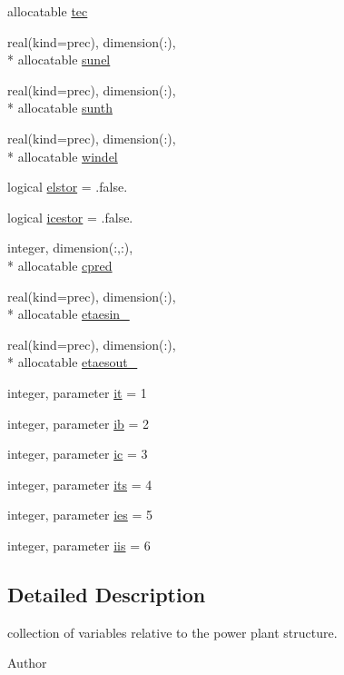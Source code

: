 \begin{DoxyCompactItemize}
allocatable \hyperlink{classplantvar_a4de39d7f2e55534eeac1a570bf8d30ff}{tec}
\item 
real(kind=prec), dimension(\-:), \\*
allocatable \hyperlink{classplantvar_ae2c75e1880b14179e8c96c8bd209f26d}{sunel}
\item 
real(kind=prec), dimension(\-:), \\*
allocatable \hyperlink{classplantvar_a1de4d45e17d60dcfca28b6bd17e74e05}{sunth}
\item 
real(kind=prec), dimension(\-:), \\*
allocatable \hyperlink{classplantvar_a90a77172411c06cf156d494ea2902bfd}{windel}
\item 
logical \hyperlink{classplantvar_a269d2dde89a5632bf0e3d0162c2368c0}{elstor} = .false.
\item 
logical \hyperlink{classplantvar_ab17684a49bca5bfae1d492eb71df86a9}{icestor} = .false.
\item 
integer, dimension(\-:,\-:), \\*
allocatable \hyperlink{classplantvar_ae294a125343fb4fbe36e5a830ec9be5d}{cpred}
\item 
real(kind=prec), dimension(\-:), \\*
allocatable \hyperlink{classplantvar_a3d6924ccf970f712f654dc0ca561b07e}{etaesin\-\_\-}
\item 
real(kind=prec), dimension(\-:), \\*
allocatable \hyperlink{classplantvar_a3d1c9aec11569f63ac581bd4176c69f1}{etaesout\-\_\-}
\item 
integer, parameter \hyperlink{classplantvar_ae20b71682087261a45478790df439eb9}{it} = 1
\item 
integer, parameter \hyperlink{classplantvar_a234a52fa723b1234d3725b82c81dad0f}{ib} = 2
\item 
integer, parameter \hyperlink{classplantvar_a395505b74fbf30b4c496601cbd47a64b}{ic} = 3
\item 
integer, parameter \hyperlink{classplantvar_aaa8d59ae7b5ae7303a9b5bd17499ce56}{its} = 4
\item 
integer, parameter \hyperlink{classplantvar_afd5b160dbbf007015da33b4011f36c83}{ies} = 5
\item 
integer, parameter \hyperlink{classplantvar_a1c564e79e51182f3e016679d50615c49}{iis} = 6
\end{DoxyCompactItemize}


\subsection{Detailed Description}
collection of variables relative to the power plant structure. \begin{DoxyAuthor}{Author}

\end{DoxyAuthor}


